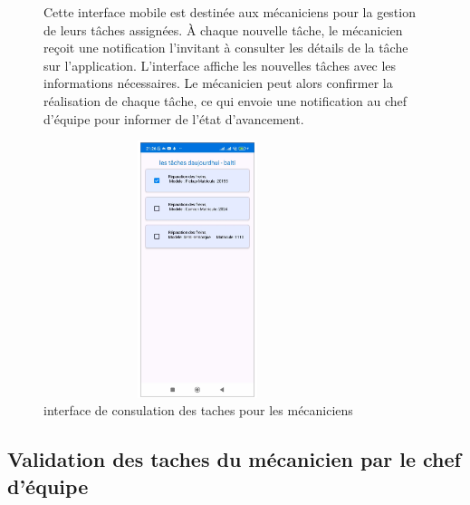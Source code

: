 \begin{figure}[htbp]
  \centering
  \begin{minipage}{0.58\textwidth}
    \raggedright
    Cette interface mobile est destinée aux mécaniciens pour la gestion de leurs tâches assignées. À chaque nouvelle tâche, le mécanicien reçoit une notification l'invitant à consulter les détails de la tâche sur l'application. L'interface affiche les nouvelles tâches avec les informations nécessaires. Le mécanicien peut alors confirmer la réalisation de chaque tâche, ce qui envoie une notification au chef d'équipe pour informer de l'état d'avancement.
  \end{minipage}
  \hfill
  \begin{minipage}{0.39\textwidth}
    \centering
    \includegraphics[width=0.8\textwidth,height=7.5cm]{chap4.images/consulation des taches.png}
    \caption{interface de consulation des taches pour les mécaniciens }
  \end{minipage}
\end{figure}
\bigskip
\subsection{Validation des taches du mécanicien par le chef d'équipe }

